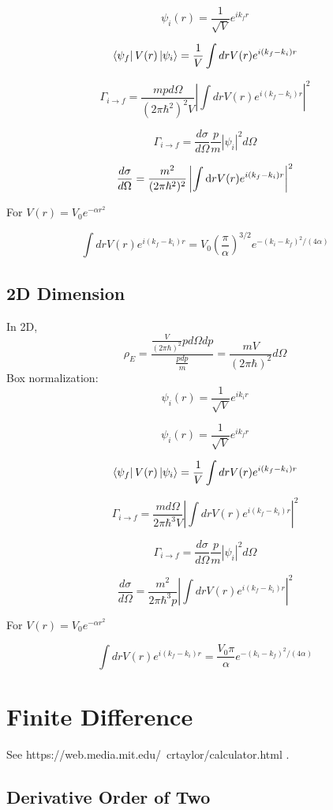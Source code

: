 \documentclass[12pt,twoside]{article}
\def\df{{\rm d}}
\begin{document}
$$
\psi_i(r) = \frac{1}{\sqrt{V}} e^{i k_f r}
$$

$$
\bra{\psi_f} V(r) \ket{\psi_i} =  \frac{1}{V} \int dr V(r) e^{i(k_f - k_i) r}
$$

$$
\Gamma_{i\rightarrow f} = \frac{mp d\Omega}{(2\pi \hbar^2)^2 V} \left|\int dr V(r) e^{i(k_f - k_i) r} \right|^2
$$

$$
\Gamma_{i\rightarrow f} = \frac{d\sigma}{d\Omega} \frac{p}{m} |\psi_i|^2 d\Omega
$$

$$
\frac{d\sigma}{d\Omega} = \frac{m^2}{(2\pi \hbar^2)^2} \left|\int \df r V(r) e^{i(k_f - k_i) r}\right|^2
$$

For $V(r) = V_0 e^{-\alpha r^2}$

$$
\int dr V(r) e^{i(k_f - k_i) r} = V_0 (\frac{\pi}{\alpha})^{3/2} e^{-(k_i - k_f)^2/(4\alpha)}
$$


\subsection{2D Dimension}

In 2D,
$$
\rho_E = \frac{
\frac{V}{(2\pi\hbar)^2}{ p d\Omega dp}
}{
\frac{p dp}{m}
}
=
\frac{m V}{(2\pi\hbar)^2}{d\Omega}
$$
Box normalization:
$$
\psi_i(r) = \frac{1}{\sqrt{V}} e^{i k_i r}
$$

$$
\psi_i(r) = \frac{1}{\sqrt{V}} e^{i k_f r}
$$

$$
\bra{\psi_f} V(r) \ket{\psi_i} =  \frac{1}{V} \int dr V(r) e^{i(k_f - k_i) r}
$$

$$
\Gamma_{i\rightarrow f} = \frac{m d\Omega}{2\pi \hbar^3 V} \left|\int dr V(r) e^{i(k_f - k_i) r}\right|^2
$$

$$
\Gamma_{i\rightarrow f} = \frac{d\sigma}{d\Omega} \frac{p}{m} |\psi_i|^2 d\Omega
$$

$$
\frac{d\sigma}{d\Omega} = \frac{m^2}{2\pi \hbar^3 p} \left|\int dr V(r) e^{i(k_f - k_i) r}\right|^2
$$

For $V(r) = V_0 e^{-\alpha r^2}$

$$
\int dr V(r) e^{i(k_f - k_i) r} = \frac{V_0 \pi}{\alpha} e^{-(k_i - k_f)^2/(4\alpha)}
$$


\section{Finite Difference}
See https://web.media.mit.edu/~crtaylor/calculator.html .
\subsection{Derivative Order of Two}
\end{document}
